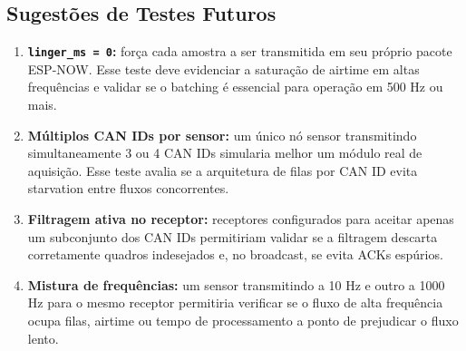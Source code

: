 \documentclass{article}
\begin{document}
    \subsection{Sugestões de Testes Futuros}

    \begin{enumerate}

    \item \textbf{\texttt{linger_ms = 0}:} força cada amostra a ser transmitida em seu próprio pacote ESP-NOW. Esse teste deve evidenciar a saturação de airtime em altas frequências e validar se o batching é essencial para operação em 500 Hz ou mais.

    \item \textbf{Múltiplos CAN IDs por sensor:} um único nó sensor transmitindo simultaneamente 3 ou 4 CAN IDs simularia melhor um módulo real de aquisição. Esse teste avalia se a arquitetura de filas por CAN ID evita starvation entre fluxos concorrentes.

    \item \textbf{Filtragem ativa no receptor:} receptores configurados para aceitar apenas um subconjunto dos CAN IDs permitiriam validar se a filtragem descarta corretamente quadros indesejados e, no broadcast, se evita ACKs espúrios.

    \item \textbf{Mistura de frequências:} um sensor transmitindo a 10 Hz e outro a 1000 Hz para o mesmo receptor permitiria verificar se o fluxo de alta frequência ocupa filas, airtime ou tempo de processamento a ponto de prejudicar o fluxo lento.

    \end{enumerate}
\end{document}
